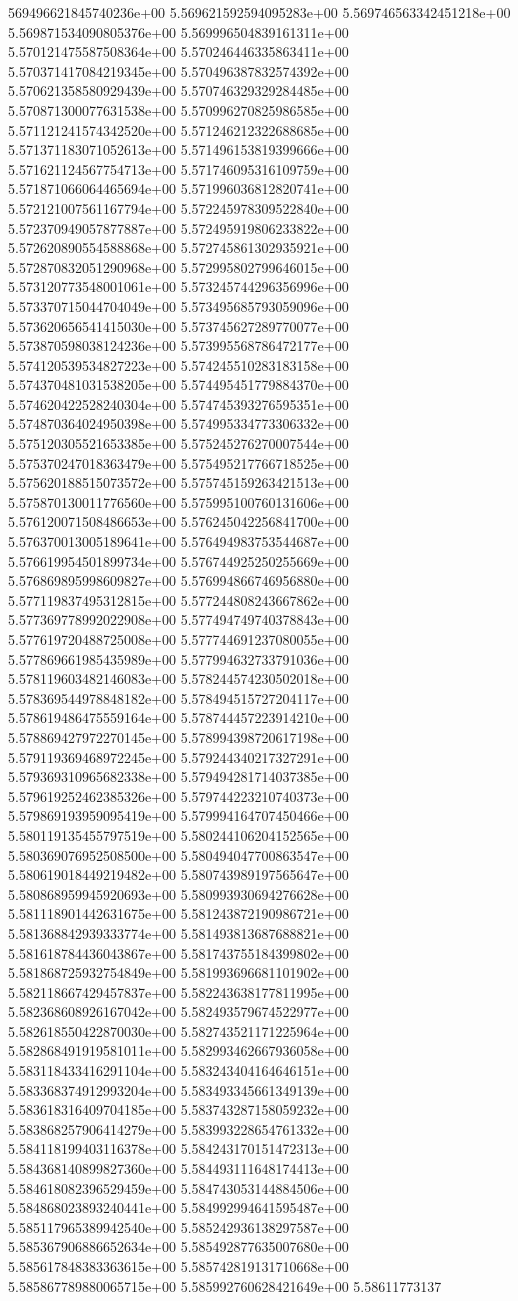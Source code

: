 569496621845740236e+00	5.569621592594095283e+00	5.569746563342451218e+00	5.569871534090805376e+00	5.569996504839161311e+00	5.570121475587508364e+00	5.570246446335863411e+00	5.570371417084219345e+00	5.570496387832574392e+00	5.570621358580929439e+00	5.570746329329284485e+00	5.570871300077631538e+00	5.570996270825986585e+00	5.571121241574342520e+00	5.571246212322688685e+00	5.571371183071052613e+00	5.571496153819399666e+00	5.571621124567754713e+00	5.571746095316109759e+00	5.571871066064465694e+00	5.571996036812820741e+00	5.572121007561167794e+00	5.572245978309522840e+00	5.572370949057877887e+00	5.572495919806233822e+00	5.572620890554588868e+00	5.572745861302935921e+00	5.572870832051290968e+00	5.572995802799646015e+00	5.573120773548001061e+00	5.573245744296356996e+00	5.573370715044704049e+00	5.573495685793059096e+00	5.573620656541415030e+00	5.573745627289770077e+00	5.573870598038124236e+00	5.573995568786472177e+00	5.574120539534827223e+00	5.574245510283183158e+00	5.574370481031538205e+00	5.574495451779884370e+00	5.574620422528240304e+00	5.574745393276595351e+00	5.574870364024950398e+00	5.574995334773306332e+00	5.575120305521653385e+00	5.575245276270007544e+00	5.575370247018363479e+00	5.575495217766718525e+00	5.575620188515073572e+00	5.575745159263421513e+00	5.575870130011776560e+00	5.575995100760131606e+00	5.576120071508486653e+00	5.576245042256841700e+00	5.576370013005189641e+00	5.576494983753544687e+00	5.576619954501899734e+00	5.576744925250255669e+00	5.576869895998609827e+00	5.576994866746956880e+00	5.577119837495312815e+00	5.577244808243667862e+00	5.577369778992022908e+00	5.577494749740378843e+00	5.577619720488725008e+00	5.577744691237080055e+00	5.577869661985435989e+00	5.577994632733791036e+00	5.578119603482146083e+00	5.578244574230502018e+00	5.578369544978848182e+00	5.578494515727204117e+00	5.578619486475559164e+00	5.578744457223914210e+00	5.578869427972270145e+00	5.578994398720617198e+00	5.579119369468972245e+00	5.579244340217327291e+00	5.579369310965682338e+00	5.579494281714037385e+00	5.579619252462385326e+00	5.579744223210740373e+00	5.579869193959095419e+00	5.579994164707450466e+00	5.580119135455797519e+00	5.580244106204152565e+00	5.580369076952508500e+00	5.580494047700863547e+00	5.580619018449219482e+00	5.580743989197565647e+00	5.580868959945920693e+00	5.580993930694276628e+00	5.581118901442631675e+00	5.581243872190986721e+00	5.581368842939333774e+00	5.581493813687688821e+00	5.581618784436043867e+00	5.581743755184399802e+00	5.581868725932754849e+00	5.581993696681101902e+00	5.582118667429457837e+00	5.582243638177811995e+00	5.582368608926167042e+00	5.582493579674522977e+00	5.582618550422870030e+00	5.582743521171225964e+00	5.582868491919581011e+00	5.582993462667936058e+00	5.583118433416291104e+00	5.583243404164646151e+00	5.583368374912993204e+00	5.583493345661349139e+00	5.583618316409704185e+00	5.583743287158059232e+00	5.583868257906414279e+00	5.583993228654761332e+00	5.584118199403116378e+00	5.584243170151472313e+00	5.584368140899827360e+00	5.584493111648174413e+00	5.584618082396529459e+00	5.584743053144884506e+00	5.584868023893240441e+00	5.584992994641595487e+00	5.585117965389942540e+00	5.585242936138297587e+00	5.585367906886652634e+00	5.585492877635007680e+00	5.585617848383363615e+00	5.585742819131710668e+00	5.585867789880065715e+00	5.585992760628421649e+00	5.58611773137